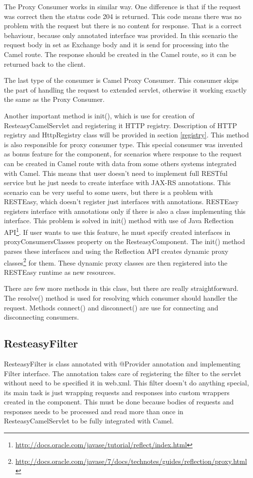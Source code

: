 \documentclass[12pt,final,oneside]{fithesis2}
\begin{document}
The Proxy Consumer works in similar way. One difference is that if the request was correct then the status code 204 is returned. This code means there was no problem with the request but there is no content for response. That is a correct behaviour, because only annotated interface was provided. In this scenario the request body in set as Exchange body and it is send for processing into the Camel route. The response should be created in the Camel route, so it can be returned back to the client.

The last type of the consumer is Camel Proxy Consumer. This consumer skips the part of handling the request to extended servlet, otherwise it working exactly the same as the Proxy Consumer.     

Another important method is init(), which is use for creation of ResteasyCamelServlet and registering it HTTP registry. Description of HTTP registry and HttpRegistry class will be provided in section \ref{registry}. This method is also responsible for proxy consumer type. This special consumer was invented as bonus feature for the component, for scenarios where response to the request can be created in Camel route with data from some others systems integrated with Camel. This means that user doesn't need to implement full RESTful service but he just needs to create interface with JAX-RS annotations. This scenario can be very useful to some users, but there is a problem with RESTEasy, which  doesn't register just interfaces with annotations. RESTEasy registers interface with annotations only if there is also a class implementing this interface. This problem is solved in init() method with use of Java Reflection API\footnote{\url{http://docs.oracle.com/javase/tutorial/reflect/index.html}}. If user wants to use this feature, he must specify created interfaces in proxyConsumersClasses property on the ResteasyComponent. The init() method parses these interfaces and using the Reflection API creates dynamic proxy classes\footnote{\url{http://docs.oracle.com/javase/7/docs/technotes/guides/reflection/proxy.html}} for them. These dynamic proxy classes are then registered into the RESTEasy runtime as new resources.

There are few more methods in this class, but there are really straightforward. The resolve() method is used for resolving which consumer should handler the request. Methods connect() and disconnect() are use for connecting and disconnecting consumers. 

\subsection*{ResteasyFilter}
ResteasyFilter is class annotated with @Provider annotation and implementing Filter interface. The annotation takes care of registering the filter to the servlet without need to be specified it in web.xml. This filter doesn't do anything special, its main task is just wrapping requests and responses into custom wrappers created in the component. This must be done because bodies of requests and responses needs to be processed and read more than once in ResteasyCamelServlet to be fully integrated with Camel.
\end{document}
